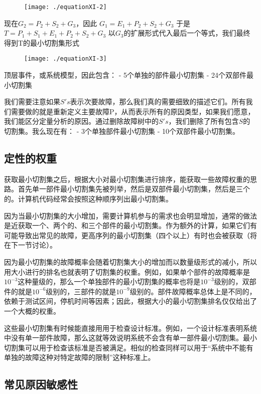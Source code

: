 \documentclass[cn,11pt,chinese]{elegantbook}
\begin{document}
{\begin{figure}[H]
	\texttt{[image: ./equationXI-2]}
\end{figure}

现在$G_2=P_2+S_2+G_3$，因此
$G_1=E_1+P_2+S_2+G_3$
于是$T=P_1+S_1+E_1+P_2+S_2+G_3$
以$G_3$的扩展形式代入最后一个等式，我们最终得到T的最小切割集形式

\begin{figure}[htpb]
	\texttt{[image: ./equationXI-3]}
\end{figure}

顶层事件，或系统模型，因此包含：
- 5个单独的部件最小切割集
- 24个双部件最小切割集

我们需要注意如果$S's$表示次要故障，那么我们真的需要细致的描述它们。所有我们需要做的就是重新定义主要故障P，从而表示所有的原因类型，如果我们愿意，我们能区分定量分析的原因。通过删除故障树中的$S's$，我们删除了所有包含$S$的切割集。我么现在有：
- 3个单独部件最小切割集
- 10个双部件最小切割集。

\subsection{定性的权重}

获取最小切割集之后，根据大小对最小切割集进行排序，能获取一些故障权重的思路。首先单一部件最小切割集先被列举，然后是双部件最小切割集，然后是三个的。计算机代码经常会按照这种顺序列出最小切割集。

因为当最小切割集的大小增加，需要计算机参与的需求也会明显增加，通常的做法是近获取一个、两个的、和三个部件的最小切割集。作为额外的计算，如果它们有可能导致出常见的故障，更高序列的最小切割集（四个以上）有时也会被获取（将在下一节讨论）。

因为最小切割集的故障概率会随着切割集大小的增加而以数量级形式的减小，所以用大小进行的排名也就表明了切割集的权重。例如，如果单个部件的故障概率是$10^{-3}$这种量级的，那么一个单独部件的最小切割集的概率也将是$10^{-3}$级别的，双部件的就是$10^{-6}$级别的，三部件的就是$10^{-9}$级别的。部件故障概率总体上是不同的，依赖于测试区间，停机时间等因素；因此，根据大小的最小切割集排名仅仅给出了一个大概的权重。

这些最小切割集有时候能直接用用于检查设计标准。例如，一个设计标准表明系统中没有单一部件故障，那么这就等效说明系统不会含有单一部件最小切割集。最小切割集可以用于检查该标准是否被满足。相似的检查同样可以用于“系统中不能有单独的故障这种对特定故障的限制”这种标准上。

\subsection{常见原因敏感性}

}
\end{document}
